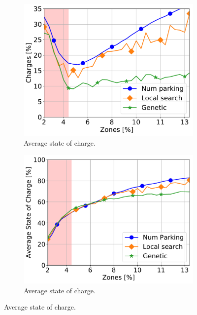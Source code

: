\begin{figure}[t!]
	\begin{center}
		\begin{subfigure}{0.49\textwidth}
			\includegraphics[width=\columnwidth]{figures/Hybrid_AmountRechargePerc.pdf}
			\caption{Average state of charge.}
			\label{fig:7_7a_recharge}
		\end{subfigure}
		\begin{subfigure}{0.49\textwidth}
			\includegraphics[width=\columnwidth]{figures/AvgSOC_comparison}
			\caption{Average state of charge.}
			\label{fig:7_7a_asoc}
		\end{subfigure}
	

\end{center}
\end{figure}

